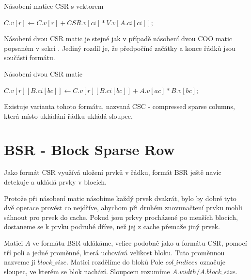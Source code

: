 \begin{algorithm}[H]
	\caption{Násobení matice CSR s vektorem}\label{csr-mvm}
	\begin{algorithmic}[1]
				\State \texttt{$C.v[r] \gets C.v[r] + CSR.v[ci] * V.v[A.ci[ci]];$}
			\EndFor
		\EndFor
		\EndProcedure
	\end{algorithmic}
\end{algorithm}

Násobení dvou CSR matic je stejné jak v případě násobení dvou COO matic popsaném v sekci . Jediný rozdíl je, že předpočíné začátky a konce řádků jsou součástí formátu.

\label{alg:csr-mmm}
\begin{algorithm}[H]
	\caption{Násobení dvou CSR matic}\label{csr-mmm}
	\begin{algorithmic}[1]
					\State \texttt{$C.v[r][B.ci[bc]] \gets C.v[r][B.ci[bc]] + A.v[ac] * B.v[bc];$}
				\EndFor
			\EndFor
		\EndFor
		\EndProcedure
	\end{algorithmic}
\end{algorithm}

Existuje varianta tohoto formátu, nazvaná CSC - compressed sparse columns, která místo ukládání řádku ukládá sloupce.


\section{BSR - Block Sparse Row}

Jako formát CSR využívá uložení prvků v řádku, formát BSR ještě navíc detekuje a ukládá prvky v blocích.

Protože při násobení matic násobíme každý prvek dvakrát, bylo by dobré tyto dvě operace provést co nejdříve, abychom při druhém znovunačtení prvku mohli sáhnout pro prvek do cache. Pokud jsou prkvy procházené po menších blocích, dostaneme se k prvku podruhé dříve, než jej z cache přemaže jiný prvek.

Matici $A$ ve formátu BSR uklákáme, velice podobně jako u formátu CSR, pomocí tří polí a jedné proměnné, která uchovává velikost bloku. Tuto proměnnou nazveme ji $block\_size$. Matici rozdělíme do bloků Pole $col\_indices$ označuje sloupec, ve kterém se blok nachází. Sloupcem rozumíme $A.width / A.block\_size$.


